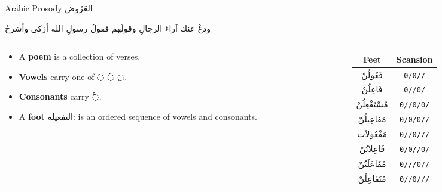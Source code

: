 \documentclass[10pt]{beamer}
\begin{document}
\begin{frame}[fragile]{Arabic Prosody \textarabic{العَرُوض}}
    \begin{Arabic}
    ودعْ عنك آراءَ الرجالِ وقولَهم\hspace{1em}  فقولُ رسولِ الله أزكى وأشرحُ
    \end{Arabic}

\begin{columns}
\begin{column}{0.7\textwidth}

\begin{itemize}
  \item A \textbf{poem } is a collection of verses.
  \item \textbf{Vowels}  carry one of \textarabic{◌َ  ◌ُ  ◌ِ}.
  \item \textbf{Consonants} carry \textarabic{◌ْ}.
  \item A \textbf{foot} \textarabic{التفعيلة}: is an ordered sequence of vowels and consonants.
\end{itemize}

\end{column}


\begin{column}{0.5\textwidth}
\begin{center}
  \begin{tabular}{|c|c|} \hline
    \textbf{Feet} & \textbf{Scansion} \\
    \hline
    \textarabic{فَعُولُنْ}  & \texttt{0/0//}\\
    \textarabic{فَاعِلُنْ}  & \texttt{0//0/}\\
    \textarabic{مُسْتَفْعِلُنْ}& \texttt{0//0/0/}\\
    \textarabic{مَفاعِيلُنْ}& \texttt{0/0/0//}\\
    \textarabic{مَفْعُولاَت} & \texttt{0//0///}\\
    \textarabic{فَاعِلاَتُنْ} & \texttt{0/0//0/}\\
    \textarabic{مُفَاعَلَتُنْ}& \texttt{0///0//}\\
    \textarabic{مُتَفَاعِلُنْ}& \texttt{0//0///}\\
    \hline
  \end{tabular}
\end{center}
\end{column}
\end{columns}
\end{frame}
\end{document}
